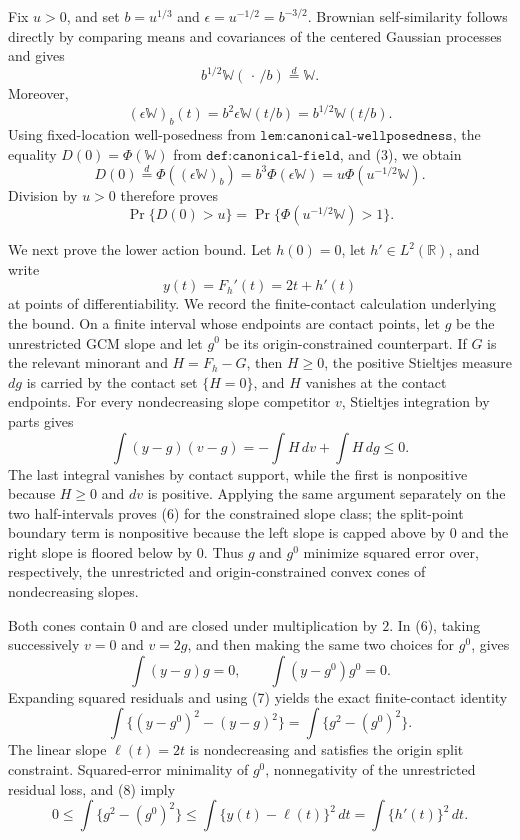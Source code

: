 Fix \(u>0\), and set \(b=u^{1/3}\) and \(\epsilon=u^{-1/2}=b^{-3/2}\).  Brownian self-similarity follows directly by comparing means and covariances of the centered Gaussian processes and gives
\[
 b^{1/2}\mathbb W(\,\cdot\,/b)\stackrel{d}{=}\mathbb W.
\]
Moreover,
\[
 (\epsilon\mathbb W)_b(t)
 =b^2\epsilon\mathbb W(t/b)
 =b^{1/2}\mathbb W(t/b).
\]
Using fixed-location well-posedness from \(\texttt{lem:canonical-wellposedness}\), the equality \(D(0)=\Phi(\mathbb W)\) from \(\texttt{def:canonical-field}\), and (3), we obtain
\[
 D(0)\stackrel{d}{=}\Phi((\epsilon\mathbb W)_b)
 =b^3\Phi(\epsilon\mathbb W)
 =u\Phi(u^{-1/2}\mathbb W).
\]
Division by \(u>0\) therefore proves
\[
 \Pr\{D(0)>u\}=\Pr\{\Phi(u^{-1/2}\mathbb W)>1\}. \tag{5}
\]

We next prove the lower action bound.  Let \(h(0)=0\), let \(h'\in L^2(\mathbb R)\), and write
\[
 y(t)=F_h'(t)=2t+h'(t)
\]
at points of differentiability.  We record the finite-contact calculation underlying the bound.  On a finite interval whose endpoints are contact points, let \(g\) be the unrestricted GCM slope and let \(g^0\) be its origin-constrained counterpart.  If \(G\) is the relevant minorant and \(H=F_h-G\), then \(H\ge0\), the positive Stieltjes measure \(dg\) is carried by the contact set \(\{H=0\}\), and \(H\) vanishes at the contact endpoints.  For every nondecreasing slope competitor \(v\), Stieltjes integration by parts gives
\[
 \int (y-g)(v-g)
 =-\int H\,dv+\int H\,dg
 \le0. \tag{6}
\]
The last integral vanishes by contact support, while the first is nonpositive because \(H\ge0\) and \(dv\) is positive.  Applying the same argument separately on the two half-intervals proves (6) for the constrained slope class; the split-point boundary term is nonpositive because the left slope is capped above by \(0\) and the right slope is floored below by \(0\).  Thus \(g\) and \(g^0\) minimize squared error over, respectively, the unrestricted and origin-constrained convex cones of nondecreasing slopes.

Both cones contain \(0\) and are closed under multiplication by \(2\).  In (6), taking successively \(v=0\) and \(v=2g\), and then making the same two choices for \(g^0\), gives
\[
 \int (y-g)g=0,
 \qquad
 \int (y-g^0)g^0=0. \tag{7}
\]
Expanding squared residuals and using (7) yields the exact finite-contact identity
\[
 \int\{(y-g^0)^2-(y-g)^2\}
 =\int\{g^2-(g^0)^2\}. \tag{8}
\]
The linear slope \(\ell(t)=2t\) is nondecreasing and satisfies the origin split constraint.  Squared-error minimality of \(g^0\), nonnegativity of the unrestricted residual loss, and (8) imply
\[
 0\le \int\{g^2-(g^0)^2\}
 \le \int\{y(t)-\ell(t)\}^2\,dt
 =\int\{h'(t)\}^2\,dt. \tag{9}
\]

